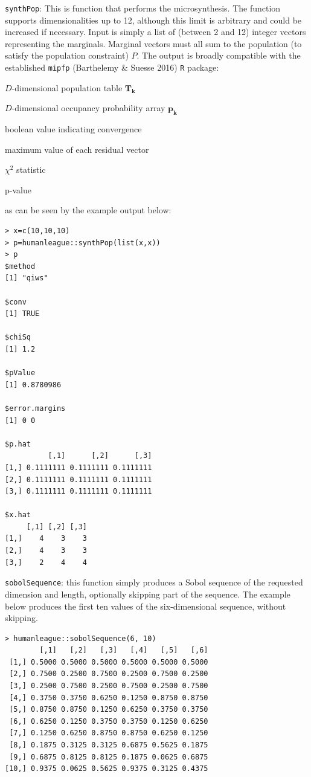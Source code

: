 \documentclass{JASSS}
\newenvironment{Shaded}{\begin{snugshade}}{\end{snugshade}}
\begin{document}
\texttt{synthPop}: This is function that performs the microsynthesis. The function supports dimensionalities up to 12, although this
limit is arbitrary and could be increased if necessary. Input is simply
a list of (between 2 and 12) integer vectors representing the marginals. Marginal vectors
must all sum to the population (to satisfy the population constraint) \(P\).
The output is broadly compatible with the established \texttt{mipfp}
(Barthelemy \& Suesse 2016) \texttt{R} package:
\begin{itemize*}
\item
  \(D\)-dimensional population table \(\mathbf{T_\mathbf{k}}\)
\item
  \(D\)-dimensional occupancy probability array
  \(\mathbf{p_\mathbf{k}}\)
\item
  boolean value indicating convergence
\item
  maximum value of each residual vector
\item
  \(\chi^2\) statistic
\item
  p-value
\end{itemize*} as can be seen by the example output below:
\begin{Shaded}
\begin{verbatim}
> x=c(10,10,10)
> p=humanleague::synthPop(list(x,x))
> p
$method
[1] "qiws"

$conv
[1] TRUE

$chiSq
[1] 1.2

$pValue
[1] 0.8780986

$error.margins
[1] 0 0

$p.hat
          [,1]      [,2]      [,3]
[1,] 0.1111111 0.1111111 0.1111111
[2,] 0.1111111 0.1111111 0.1111111
[3,] 0.1111111 0.1111111 0.1111111

$x.hat
     [,1] [,2] [,3]
[1,]    4    3    3
[2,]    4    3    3
[3,]    2    4    4
\end{verbatim}
\end{Shaded}

\texttt{sobolSequence}: this function simply produces a Sobol sequence of the requested dimension and length, optionally skipping part of the sequence. The example below produces the first ten values of the six-dimensional sequence, without skipping.
\begin{Shaded}
\begin{verbatim}
> humanleague::sobolSequence(6, 10)
        [,1]   [,2]   [,3]   [,4]   [,5]   [,6]
 [1,] 0.5000 0.5000 0.5000 0.5000 0.5000 0.5000
 [2,] 0.7500 0.2500 0.7500 0.2500 0.7500 0.2500
 [3,] 0.2500 0.7500 0.2500 0.7500 0.2500 0.7500
 [4,] 0.3750 0.3750 0.6250 0.1250 0.8750 0.8750
 [5,] 0.8750 0.8750 0.1250 0.6250 0.3750 0.3750
 [6,] 0.6250 0.1250 0.3750 0.3750 0.1250 0.6250
 [7,] 0.1250 0.6250 0.8750 0.8750 0.6250 0.1250
 [8,] 0.1875 0.3125 0.3125 0.6875 0.5625 0.1875
 [9,] 0.6875 0.8125 0.8125 0.1875 0.0625 0.6875
[10,] 0.9375 0.0625 0.5625 0.9375 0.3125 0.4375
\end{verbatim}
\end{Shaded}
\end{document}
